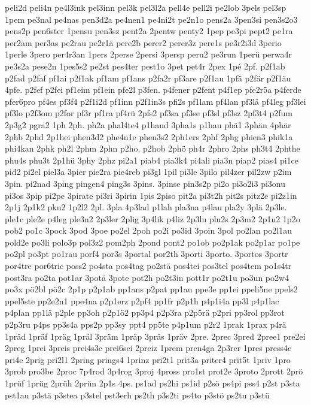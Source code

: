 {peli2d
peli4n
pe4l3ink
pel3inn
pel3k
pel3l2a
pell4e
pell2i
pe2lob
3pels
pel3sp
1pem
pe3nal
pe4nas
pen3d2a
pe4nen1
pe4ni2t
pe2n1o
pens2a
3pen3si
pen3s2o3
pens2p
pen6ster
1pensu
pen3sz
pent2a
2pentw
penty2
1pep
pe3pi
pept2
pe1ra
per2am
per3as
pe2rau
pe2r1ä
pere2b
perer2
perer3z
pere1s
pe3r2i3d
3perio
1perle
3pero
per4r3an
1pers
2perse
2persi
3persp
peru2
pe3run
1perü
perwa4r
pe3s2a
pese2n
1pes5s2
pe2st
pes4ter
pest1o
3pet
pet4r
2pex
1pé
2pf.
p2f1ab
p2fad
p2faf
pf1ai
p2f1ak
pf1am
pf1ans
p2fa2r
pf3are
p2f1au
1pfä
p2fär
p2f1äu
4pfe.
p2fef
p2fei
pf1eim
pf1ein
pfe2l
p3fen.
p4fener
p2fent
p4f1ep
pfe2r5a
p4ferde
pfer6pro
pf4es
pf3f4
p2f1i2d
pf1inn
p2f1in3s
pfi2s
pf1lam
pf4lan
pf3lä
pf4leg
pf3lei
pf3lo
p2f3om
p2for
pf3r
pf1ra
pf4rü
2pfs2
pf3sa
pf3se
pf3sl
pf3sz
2pf3t4
p2fum
2p3g2
pgra2
1ph
2ph.
ph2a
phal4te4
p1hand
3pha1s
p1hau
phä1
3phän
4phär
2phb
2phd
2p1hei
phen3d2
phe4n1e
phen3s2
2ph1ers
2phf
2phg
phien3
phik1a
phi4kan
2phk
ph2l
2phm
2phn
p2ho.
p2hob
2phö
ph4r
2phro
2phs
ph3t4
2phthe
phu4s
phu3t
2p1hü
3phy
2phz
pi2a1
piab4
pia3k4
pi4ali
pia3n
piap2
pias4
pi1ce
pid2
pi2el
piel3a
3pier
pie2ra
pie4reb
pi3gl
1pil
pi3le
3pilo
pil4zer
pil2zw
p2im
3pin.
pi2nad
3ping
pingen4
ping3s
3pins.
3pinse
pin3s2p
pi2o
pi3o2i3
pi3onu
pi3os
3pip
pi2pe
3pirate
pi3ri
3pirin
1pis
2piso
pit2a
pi3t2h
pit2s
pitz2e
pi2z1in
2p1j
2p1k2
pku2
1p2l2
2pl.
3pla
4p3lad
p1lah
pla3na
p4lau
pla2y
3plä
2p3le.
ple1c
ple2e
p4leg
ple3n2
2p3ler
2plig
3p4lik
p4liz
2p3lu
plu2s
2p3m2
2p1n2
1p2o
pob2
po1c
3pock
3pod
3poe
po2el
2poh
po2i
po3id
3poin
3pol
po2lan
po2l1au
pold2e
po3li
polo3p
pol3z2
pom2ph
2pond
pont2
po1ob
po2p1ak
po2p1ar
po1pe
po2pl
po3pt
po1rau
porf4
por3s
3portal
por2th
3porti
3porto.
3portos
3portr
por4tre
por6tric
poss2
po4sta
pos4tag
po2stä
pos4tei
pos3tel
pos4tem
po1s4tr
post3ra
po2ta
pot1ar
3potä
3pote
pot2h
po2t3in
pott1r
po2t1u
po3un
po2w4
po3x
pö2bl
pö2c
2p1p
p2p1ab
pp1ans
p2pat
pp1au
ppe3e
pp1ei
ppeli5ne
ppels2
ppel5ste
pp2e2n1
ppe4na
p2p1erz
p2pf4
pp1fr
p2p1h
p4p1i4a
pp3l
p4p1lac
p4plan
pp1lä
p2ple
pp3oh
p2p1ö2
pp3p4
p2p3ra
p2p5rä
p2pri
pp3rol
pp3rot
p2p3ru
p4ps
pp3s4a
pps2p
pp3sy
ppt4
pp5te
p4p1um
p2r2
1prak
1prax
p4rä
1präd
1präf
1präg
1präl
3präm
1präp
3präs
1präv
2pre.
2prec
3pred
2pree1
pre2ei
2preg
1prei
3preis
prei4s3c
prei6sei
2preiz
1prem
pren4ga
2p3rer
1pres
press4e
pri4e
2prig
pri2l1
2pring
prings4
1prinz
pri2t1
prit3a
priter4
prit5t
1priv
1pro
3prob
pro3be
2proc
7p4rod
3p4rog
3proj
4pross
pro1st
prot2e
3proto
2prott
2prö
1prüf
1prüg
2prüh
2prün
2p1s
4ps.
ps1ad
ps2hi
ps1id
p2sö
ps4pi
pss4
p2st
p3sta
pst1au
p3stä
p3stea
p3stel
pst3erh
ps2th
p3s2ti
ps4to
p3stö
ps2tu
p3stü
}
